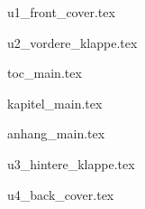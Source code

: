 \documentclass{skript}
\begin{document}
{u1_front_cover.tex}

{u2_vordere_klappe.tex}

{toc_main.tex}

{kapitel_main.tex}

{anhang_main.tex}

{u3_hintere_klappe.tex}

{u4_back_cover.tex}
	
\end{document}
